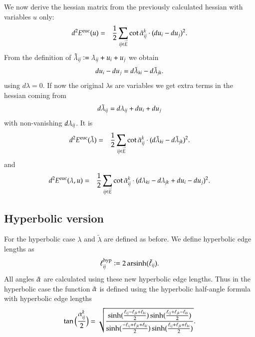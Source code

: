 \documentclass[Thesis]{subfiles}
\begin{document}
We now derive the hessian matrix from the previously calculated hessian with variables $u$ only:
\begin{eqnarray}
d^2E^{\rm euc}(u)&=&\frac{1}{2}\sum_{\it ij \in \accentset{\rightharpoonup}{E}} \cot  \tilde{\alpha}_{\it ij}^k \cdot (du_i - du_j)^2.
\end{eqnarray}
From the definition of $\tilde\lambda_{\it ij} \vcentcolon= \lambda_{\it ij}+u_i+u_j$ we obtain
\[du_i-du_j=d\tilde\lambda_{\it ki}-d\tilde\lambda_{\it jk}.\]
using $d\lambda = 0$. If now the original $\lambda$s are variables we get extra terms in the hessian coming from 
\[d\tilde\lambda_{\it ij}=d\lambda_{\it ij}+du_i+du_j\]
with non-vanishing $d\lambda_{\it ij}$. It is
\begin{eqnarray*}
d^2E^{\rm euc}(\tilde\lambda)
&=&\frac{1}{2}\sum_{\it ij \in \accentset{\rightharpoonup}{E}} \cot  \tilde{\alpha}_{\it ij}^k \cdot (d\tilde\lambda_{\it ki}-d\tilde\lambda_{\it jk})^2.
\end{eqnarray*}
and
\begin{eqnarray*}
d^2E^{\rm euc}(\lambda, u)&=&\frac{1}{2}\sum_{\it ij \in \accentset{\rightharpoonup}{E}} \cot  \tilde{\alpha}_{\it ij}^k \cdot (d\lambda_{\it ki}-d\lambda_{\it jk} + du_i - du_j)^2.
\end{eqnarray*}

\subsection{Hyperbolic version}
\label{sec:hyperbolic_fuctional}

For the hyperbolic case $\lambda$ and $\tilde\lambda$ are defined as before. We define hyperbolic edge lengths as 
\begin{equation}
\ell^{\rm hyp}_{\it ij} \vcentcolon= 2\operatorname{arsinh}(\tilde \ell_{\it ij}).\label{eq:hyperbolic_lengths}
\end{equation}
All angles $\tilde{\alpha}$ are calculated using these new hyperbolic edge lengths.
Thus in the hyperbolic case the function $\tilde{\alpha}$ is defined using the hyperbolic half-angle formula with hyperbolic edge lengths
\[
  \tan\Big(\frac{\alpha^k_{\it ij}}{2}\Big)=
  \sqrt{\frac{
      \sinh(\frac{\ell_{ij}-\ell_{jk}+\ell_{ki}}{2})
      \sinh(\frac{\ell_{ij}+\ell_{jk}-\ell_{ki}}{2})
    }{
      \sinh(\frac{-\ell_{ij}+\ell_{jk}+\ell_{ki}}{2})
      \sinh(\frac{\ell_{ij}+\ell_{jk}+\ell_{ki}}{2})
    }}.
\]
\end{document}
